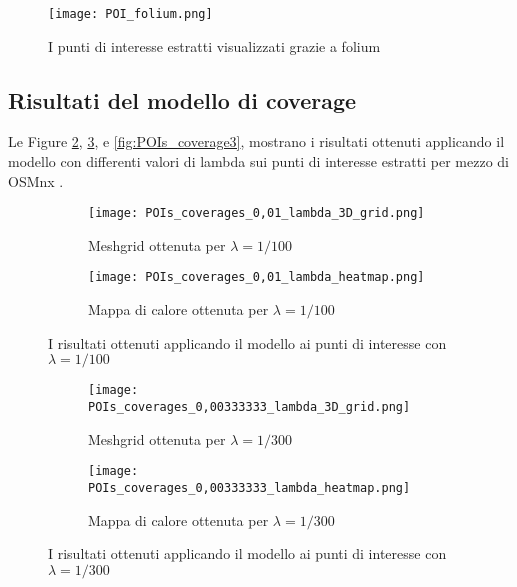 \begin{figure}[H]
	\centering 
	\texttt{[image: POI\_folium.png]}
	\caption[Mappa dei punti di interesse]{I punti di interesse estratti visualizzati grazie a folium}
	\label{fig:POI}
\end{figure}


\subsection{Risultati del modello di coverage}
Le Figure \ref{fig:POIs_coverage1}, \ref{fig:POIs_coverage2}, e \ref{fig:POIs_coverage3}, mostrano i risultati ottenuti applicando il modello con differenti valori di lambda sui punti di interesse estratti per mezzo di OSMnx \cite{osmnx}. 

\newpage

\begin{figure}[H]
	\centering
	\begin{subfigure}[b]{\linewidth}
		\texttt{[image: POIs\_coverages\_0,01\_lambda\_3D\_grid.png]}
		\caption{Meshgrid ottenuta per $\lambda = 1/100$}
	\end{subfigure}
	\begin{subfigure}[b]{\linewidth}
		\texttt{[image: POIs\_coverages\_0,01\_lambda\_heatmap.png]}
		\caption{Mappa di calore ottenuta per $\lambda = 1/100$}
	\end{subfigure}
	\caption[Risultati POIs, $\lambda = 1/100$]{I risultati ottenuti applicando il modello ai punti di interesse con $\lambda = 1/100$}
	\label{fig:POIs_coverage1}
\end{figure}

\begin{figure}[H]
	\centering
	\begin{subfigure}[b]{\linewidth}
		\texttt{[image: POIs\_coverages\_0,00333333\_lambda\_3D\_grid.png]}
		\caption{Meshgrid ottenuta per $\lambda = 1/300$}
	\end{subfigure}
	\begin{subfigure}[b]{\linewidth}
		\texttt{[image: POIs\_coverages\_0,00333333\_lambda\_heatmap.png]}
		\caption{Mappa di calore ottenuta per $\lambda = 1/300$}
	\end{subfigure}
	\caption[Risultati POIs, $\lambda = 1/300$]{I risultati ottenuti applicando il modello ai punti di interesse con $\lambda = 1/300$}
	\label{fig:POIs_coverage2}
\end{figure}

